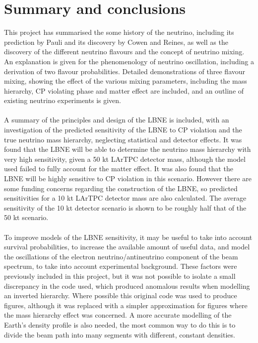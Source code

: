 \documentclass[12pt]{article}
\begin{document}
\section{Summary and conclusions}
This project has summarised the some history of the neutrino, including its prediction by Pauli and its discovery by Cowen and Reines, as well as the discovery of the different neutrino flavours and the concept of neutrino mixing. An explanation is given for the phenomenology of neutrino oscillation, including a derivation of two flavour probabilities. Detailed demonstrations of three flavour mixing, showing the effect of the various mixing parameters, including the mass hierarchy, CP violating phase and matter effect are included, and an outline of existing neutrino experiments is given.\\\\
A summary of the principles and design of the LBNE is included, with an investigation of the predicted sensitivity of the LBNE to CP violation and the true neutrino mass hierarchy, neglecting statistical and detector effects. It was found that the LBNE
will be able to determine the neutrino mass hierarchy with very high sensitivity, given a 50 kt LArTPC detector mass, although the model used failed to fully account for the matter effect. It was also found that the LBNE will be highly sensitive to CP violation in this scenario. However there are some funding concerns regarding the construction of the LBNE, so predicted sensitivities for a 10 kt LArTPC detector mass are also calculated. The average sensitivity of the 10 kt detector scenario is shown to be roughly half that of the 50 kt scenario.\\\\
To improve models of the LBNE sensitivity, it may be useful to take into account survival probabilities, to increase the available amount of useful data, and model the oscillations of the electron neutrino/antineutrino component of the beam spectrum, to take into account experimental background. These factors were previously included in this project, but it was not possible to isolate a small discrepancy in the code used, which produced anomalous results when modelling an inverted hierarchy. Where possible this original code was used to produce figures, although it was replaced with a simpler approximation for figures where the mass hierarchy effect was concerned. A more accurate modelling of the Earth's density profile is also needed, the most common way to do this is to divide the beam path into many segments with different, constant densities.
\end{document}
